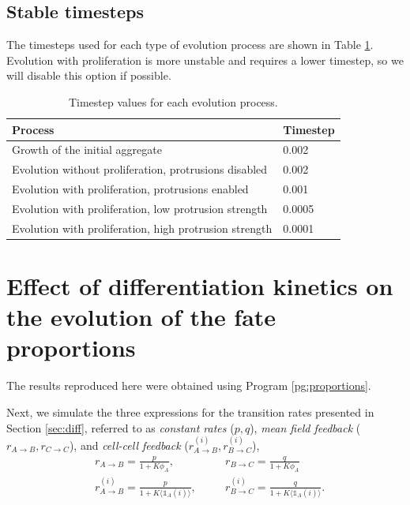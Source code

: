 \subsection{Stable timesteps}

The timesteps used for each type of evolution process are shown in Table \ref{tab:timestep}. Evolution with proliferation is more unstable and requires a lower timestep, so we will disable this option if possible. 

\begin{table}[h]
    \centering
    \begin{tabular}{|m{6.5cm}|m{2cm}|}
        \hline
        \textbf{Process} & \textbf{Timestep} \\
        \hline
        Growth of the initial aggregate & 0.002 \\
        \hline
        Evolution without proliferation, \newline protrusions disabled & 0.002 \\
        \hline
        Evolution with proliferation, \newline protrusions enabled & 0.001 \\
        \hline
        Evolution with proliferation, \newline low protrusion strength & 0.0005 \\
        \hline
        Evolution with proliferation, \newline high protrusion strength & 0.0001 \\
        \hline
    \end{tabular}
    \caption{Timestep values for each evolution process.}
    \label{tab:timestep}
\end{table}




\section{Effect of differentiation kinetics on the evolution of the fate proportions}

The results reproduced here were obtained using Program \ref{pg:proportions}.

Next, we simulate the three expressions for the transition rates presented in Section \ref{sec:diff}, referred to as \textit{constant rates} ($p,q$), \textit{mean field feedback} ($r_{A\rightarrow B},r_{C\rightarrow C}$), and \textit{cell-cell feedback} ($r_{A\rightarrow B}^{(i)},r_{B\rightarrow C}^{(i)}$),
\begin{equation}
    \begin{aligned}
        &r_{A\rightarrow B}=\frac{p}{1+K\phi_A},
        &\quad
        & r_{B\rightarrow C}=\frac{q}{1+K\phi_A}\\
        &r_{A\rightarrow B}^{(i)}=\frac{p}{1+K\langle\mathds{1}_A(i)\rangle},
        &\quad
        &r_{B\rightarrow C}^{(i)}=\frac{q}{1+K\langle\mathds{1}_A(i)\rangle}.
    \end{aligned}
\end{equation}


